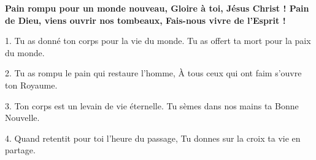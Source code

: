 \textbf{
Pain rompu pour un monde nouveau,
Gloire à toi, Jésus Christ !
Pain de Dieu, viens ouvrir nos tombeaux,
Fais-nous vivre de l'Esprit !
}

1.
Tu as donné ton corps pour la vie du monde.
Tu as offert ta mort pour la paix du monde.

2.
Tu as rompu le pain qui restaure l'homme,
À tous ceux qui ont faim s'ouvre ton Royaume.

3.
Ton corps est un levain de vie éternelle.
Tu sèmes dans nos mains ta Bonne Nouvelle.

4.
Quand retentit pour toi l'heure du passage,
Tu donnes sur la croix ta vie en partage.

